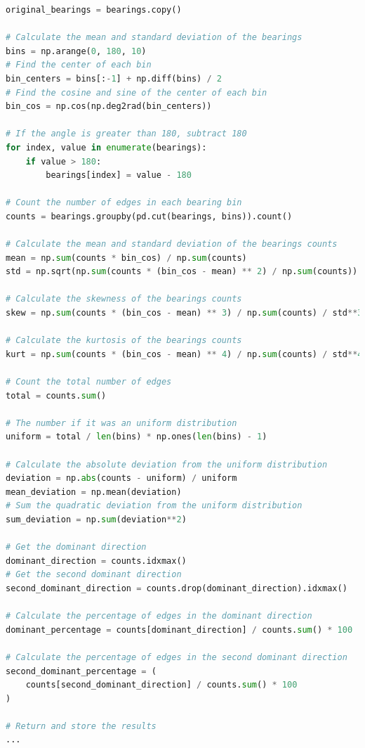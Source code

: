 \begin{lstlisting}[language=Python, label={lst:aprofund1}, caption= \small Continuação da análise de orientação de vias \normalsize]
original_bearings = bearings.copy()

# Calculate the mean and standard deviation of the bearings
bins = np.arange(0, 180, 10)
# Find the center of each bin
bin_centers = bins[:-1] + np.diff(bins) / 2
# Find the cosine and sine of the center of each bin
bin_cos = np.cos(np.deg2rad(bin_centers))

# If the angle is greater than 180, subtract 180
for index, value in enumerate(bearings):
    if value > 180:
        bearings[index] = value - 180

# Count the number of edges in each bearing bin
counts = bearings.groupby(pd.cut(bearings, bins)).count()

# Calculate the mean and standard deviation of the bearings counts
mean = np.sum(counts * bin_cos) / np.sum(counts)
std = np.sqrt(np.sum(counts * (bin_cos - mean) ** 2) / np.sum(counts))

# Calculate the skewness of the bearings counts
skew = np.sum(counts * (bin_cos - mean) ** 3) / np.sum(counts) / std**3

# Calculate the kurtosis of the bearings counts
kurt = np.sum(counts * (bin_cos - mean) ** 4) / np.sum(counts) / std**4

# Count the total number of edges
total = counts.sum()

# The number if it was an uniform distribution
uniform = total / len(bins) * np.ones(len(bins) - 1)

# Calculate the absolute deviation from the uniform distribution
deviation = np.abs(counts - uniform) / uniform
mean_deviation = np.mean(deviation)
# Sum the quadratic deviation from the uniform distribution
sum_deviation = np.sum(deviation**2)

# Get the dominant direction
dominant_direction = counts.idxmax()
# Get the second dominant direction
second_dominant_direction = counts.drop(dominant_direction).idxmax()

# Calculate the percentage of edges in the dominant direction
dominant_percentage = counts[dominant_direction] / counts.sum() * 100

# Calculate the percentage of edges in the second dominant direction
second_dominant_percentage = (
    counts[second_dominant_direction] / counts.sum() * 100
)

# Return and store the results
...
\end{lstlisting}

